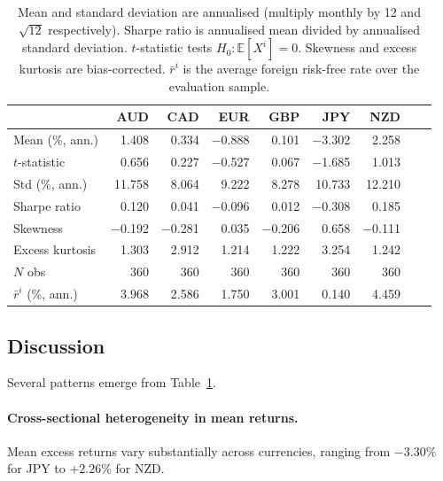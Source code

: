 \documentclass[a4paper,12pt]{article}
\begin{document}
\begin{table}[H]
\centering
\caption{Currency Excess Returns --- Summary Statistics (Jan 1995 -- Dec 2024)}
\label{tab:table1}
\renewcommand{\arraystretch}{1.3}
\begin{tabular}{lrrrrrrrr}
\toprule
 & \textbf{AUD} & \textbf{CAD} & \textbf{EUR} & \textbf{GBP} & \textbf{JPY} & \textbf{NZD} \\
\midrule
Mean (\%, ann.)        & 1.408    & 0.334    & $-$0.888 & 0.101    & $-$3.302 & 2.258  \\
$t$-statistic          & 0.656    & 0.227    & $-$0.527 & 0.067    & $-$1.685 & 1.013  \\
Std (\%, ann.)         & 11.758   & 8.064    & 9.222    & 8.278    & 10.733   & 12.210 \\
Sharpe ratio           & 0.120    & 0.041    & $-$0.096 & 0.012    & $-$0.308 & 0.185  \\
Skewness               & $-$0.192 & $-$0.281 & 0.035    & $-$0.206 & 0.658    & $-$0.111 \\
Excess kurtosis        & 1.303    & 2.912    & 1.214    & 1.222    & 3.254    & 1.242  \\
$N$ obs                & 360      & 360      & 360      & 360      & 360      & 360    \\
$\bar{r}^i$ (\%, ann.) & 3.968    & 2.586    & 1.750    & 3.001    & 0.140    & 4.459  \\
\bottomrule
\end{tabular}
\caption*{\footnotesize Mean and standard deviation are annualised (multiply monthly by 12 and $\sqrt{12}$
respectively). Sharpe ratio is annualised mean divided by annualised standard deviation.
$t$-statistic tests $H_0: \mathbb{E}[X^i] = 0$. Skewness and excess kurtosis are
bias-corrected. $\bar{r}^i$ is the average foreign risk-free rate over the evaluation sample.}
\end{table}

\subsection{Discussion}

Several patterns emerge from Table~\ref{tab:table1}.

\paragraph{Cross-sectional heterogeneity in mean returns.}
Mean excess returns vary substantially across currencies, ranging from $-3.30\%$ for JPY
to $+2.26\%$ for NZD.
\end{document}
